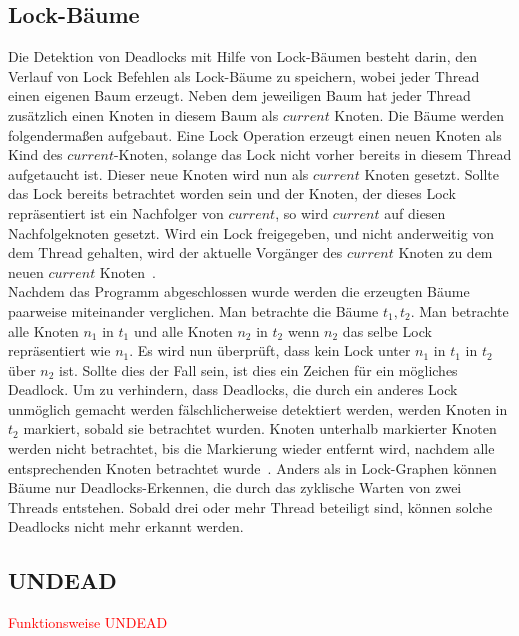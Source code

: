 \subsection{Lock-Bäume }
Die Detektion von Deadlocks mit Hilfe von Lock-Bäumen besteht darin, den 
Verlauf von Lock Befehlen als Lock-Bäume zu speichern, wobei jeder Thread 
einen eigenen Baum erzeugt. Neben dem jeweiligen Baum hat jeder Thread 
zusätzlich einen Knoten in diesem Baum als $current$ Knoten.
Die Bäume werden folgendermaßen aufgebaut. Eine Lock Operation erzeugt einen 
neuen Knoten als Kind des $current$-Knoten, solange das Lock nicht vorher 
bereits in diesem Thread aufgetaucht ist. Dieser neue Knoten wird nun als 
$current$ Knoten gesetzt. Sollte das Lock bereits betrachtet worden sein und 
der Knoten, der dieses Lock repräsentiert ist ein Nachfolger von $current$, so 
wird $current$ auf diesen Nachfolgeknoten gesetzt. Wird ein Lock freigegeben,
und nicht anderweitig von dem Thread gehalten, wird der aktuelle Vorgänger des 
$current$ Knoten zu dem neuen $current$ Knoten~\cite{havelund}.\\
Nachdem das Programm abgeschlossen wurde werden die erzeugten Bäume paarweise 
miteinander verglichen. Man betrachte die Bäume $t_1, t_2$. Man betrachte 
alle Knoten $n_1$ in $t_1$ und alle Knoten $n_2$ in $t_2$ wenn $n_2$ das selbe 
Lock repräsentiert wie $n_1$. Es wird nun überprüft, dass kein Lock unter $n_1$
in $t_1$ in $t_2$ über $n_2$ ist. Sollte dies der Fall sein, ist dies ein Zeichen 
für ein mögliches Deadlock. Um zu verhindern, dass Deadlocks, die durch ein 
anderes Lock unmöglich gemacht werden fälschlicherweise detektiert werden,
werden Knoten in $t_2$ markiert, sobald sie betrachtet wurden. Knoten unterhalb
markierter Knoten werden nicht betrachtet, bis die Markierung wieder entfernt wird,
nachdem alle entsprechenden Knoten betrachtet wurde~\cite{havelund}.
Anders als in Lock-Graphen können Bäume nur Deadlocks-Erkennen, die durch das 
zyklische Warten von zwei Threads entstehen. Sobald drei oder mehr Thread beteiligt
sind, können solche Deadlocks nicht mehr erkannt werden.



\subsection{UNDEAD}
\textcolor{red}{Funktionsweise UNDEAD}
